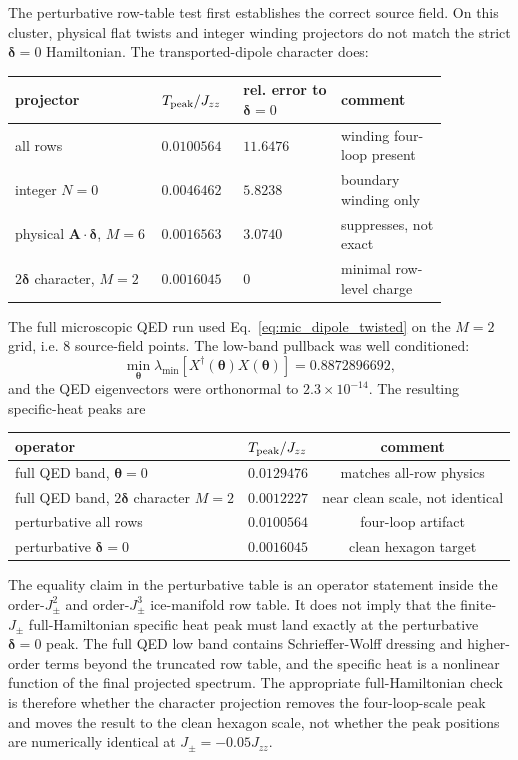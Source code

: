 \documentclass[11pt,letterpaper]{article}
\newcommand{\Jzz}{J_{zz}}
\newcommand{\Jpm}{J_{\pm}}
\newcommand{\bA}{\bm A}
\newcommand{\bdelta}{\bm \delta}
\newcommand{\btheta}{\bm \theta}
\theoremstyle{plain}
\theoremstyle{definition}
\begin{document}
The perturbative row-table test first establishes the correct source field.
On this cluster, physical flat twists and integer winding projectors do not
match the strict $\bdelta=0$ Hamiltonian.  The transported-dipole character
does:
\begin{center}
\footnotesize
\begin{tabular}{@{}p{0.30\linewidth}p{0.14\linewidth}p{0.20\linewidth}p{0.22\linewidth}@{}}
\toprule
projector & $T_{\rm peak}/\Jzz$ & rel. error to $\bdelta=0$
& comment\\
\midrule
all rows & $0.0100564$ & $11.6476$ & winding four-loop present\\
integer $N=0$ & $0.0046462$ & $5.8238$ & boundary winding only\\
physical $\bA\!\cdot\!\bdelta$, $M=6$ & $0.0016563$ & $3.0740$
& suppresses, not exact\\
$2\bdelta$ character, $M=2$ & $0.0016045$ & $0$
& minimal row-level charge\\
\bottomrule
\end{tabular}
\end{center}

The full microscopic QED run used Eq.~\eqref{eq:mic_dipole_twisted} on the
$M=2$ grid, i.e. $8$ source-field points.  The low-band pullback was well
conditioned:
\[
\min_{\btheta}\lambda_{\min}\!\left[
X^\dagger(\btheta)X(\btheta)\right]
=0.8872896692,
\]
and the QED eigenvectors were orthonormal to $2.3\times10^{-14}$.
The resulting specific-heat peaks are
\begin{center}
\begin{tabular}{lcc}
\toprule
operator & $T_{\rm peak}/\Jzz$ & comment\\
\midrule
full QED band, $\btheta=0$ & $0.0129476$ & matches all-row physics\\
full QED band, $2\bdelta$ character $M=2$ & $0.0012227$
& near clean scale, not identical\\
perturbative all rows & $0.0100564$ & four-loop artifact\\
perturbative $\bdelta=0$ & $0.0016045$ & clean hexagon target\\
\bottomrule
\end{tabular}
\end{center}

The equality claim in the perturbative table is an operator statement inside
the order-$\Jpm^2$ and order-$\Jpm^3$ ice-manifold row table.  It does not imply
that the finite-$\Jpm$ full-Hamiltonian specific heat peak must land exactly at
the perturbative $\bdelta=0$ peak.  The full QED low band contains
Schrieffer-Wolff dressing and higher-order terms beyond the truncated row
table, and the specific heat is a nonlinear function of the final projected
spectrum.  The appropriate full-Hamiltonian check is therefore whether the
character projection removes the four-loop-scale peak and moves the result to
the clean hexagon scale, not whether the peak positions are numerically
identical at $\Jpm=-0.05\Jzz$.
\end{document}
